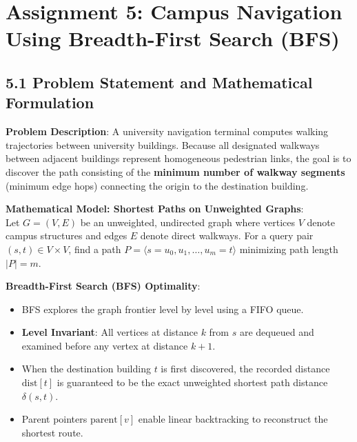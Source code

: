 \documentclass[12pt]{article}
\begin{document}
\newpage

\section*{Assignment 5: Campus Navigation Using Breadth-First Search (BFS)}

\subsection*{5.1 Problem Statement and Mathematical Formulation}
\textbf{Problem Description}: A university navigation terminal computes walking trajectories between university buildings. Because all designated walkways between adjacent buildings represent homogeneous pedestrian links, the goal is to discover the path consisting of the \textbf{minimum number of walkway segments} (minimum edge hops) connecting the origin to the destination building.

\textbf{Mathematical Model: Shortest Paths on Unweighted Graphs}:\\
Let $G = (V, E)$ be an unweighted, undirected graph where vertices $V$ denote campus structures and edges $E$ denote direct walkways. For a query pair $(s, t) \in V \times V$, find a path $P = \langle s = u_0, u_1, \dots, u_m = t \rangle$ minimizing path length $|P| = m$.

\textbf{Breadth-First Search (BFS) Optimality}:
\begin{itemize}
    \item BFS explores the graph frontier level by level using a FIFO queue.
    \item \textbf{Level Invariant}: All vertices at distance $k$ from $s$ are dequeued and examined before any vertex at distance $k + 1$.
    \item When the destination building $t$ is first discovered, the recorded distance $\text{dist}[t]$ is guaranteed to be the exact unweighted shortest path distance $\delta(s, t)$.
    \item Parent pointers $\text{parent}[v]$ enable linear backtracking to reconstruct the shortest route.
\end{itemize}
\end{document}
